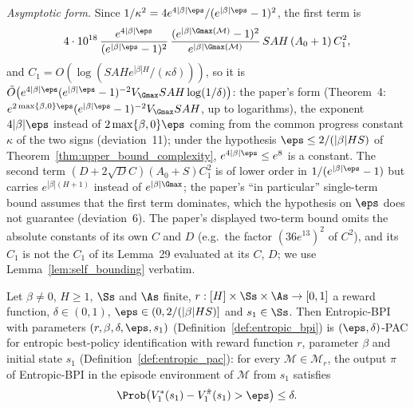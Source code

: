 \begin{remark}
\emph{Asymptotic form.} Since $1/\kappa^2 = 4e^{4|\beta|\eps}/(e^{|\beta|\eps}-1)^2$, the first
term is
\[
  4\cdot 10^{18}\,\frac{e^{4|\beta|\eps}}{(e^{|\beta|\eps} - 1)^2}\,
  \frac{(e^{|\beta|\Gmax(\mathcal M)} - 1)^2}{e^{|\beta|\Gmax(\mathcal M)}}\, SAH\,(A_0 + 1)\,C_1^2 ,
\]
and $C_1 = O(\log(SAH e^{|\beta| H}/(\kappa\delta)))$, so it is
$\tilde O\big(e^{4|\beta|\eps}(e^{|\beta|\eps}-1)^{-2} V_{\Gmax} SAH\log(1/\delta)\big)$: the
paper's form (Theorem~4: $e^{2\max\{\beta,0\}\eps}(e^{|\beta|\eps}-1)^{-2}V_{\Gmax}SAH$, up to
logarithms), the exponent $4|\beta|\eps$ instead of $2\max\{\beta,0\}\eps$ coming from the
common progress constant $\kappa$ of the two signs (deviation~11); under the hypothesis
$\eps \le 2/(|\beta|HS)$ of Theorem~\ref{thm:upper_bound_complexity}, $e^{4|\beta|\eps} \le e^8$
is a constant. The second term $(D + 2\sqrt D C)(A_0+S)C_1^2$ is of lower order in
$1/(e^{|\beta|\eps}-1)$ but carries $e^{|\beta|(H+1)}$ instead of $e^{|\beta|\Gmax}$; the
paper's ``in particular'' single-term bound assumes that the first term dominates, which the
hypothesis on $\eps$ does not guarantee (deviation~6). The paper's displayed two-term bound
omits the absolute constants of its own $C$ and $D$ (e.g.\ the factor $(36e^{13})^2$ of $C^2$),
and its $C_1$ is not the $C_1$ of its Lemma~29 evaluated at its $C$, $D$; we use
Lemma~\ref{lem:self_bounding} verbatim.
\end{remark}

\begin{theorem}\label{thm:upper_bound_pac}
\leanok
{}
Let $\beta \ne 0$, $H \ge 1$, $\Ss$ and $\As$ finite, $r : [H]\times\Ss\times\As \to [0,1]$ a
reward function, $\delta \in (0,1)$, $\eps \in (0, 2/(|\beta| H S)]$ and $s_1 \in \Ss$. Then
Entropic-BPI with parameters $(r, \beta, \delta, \eps, s_1)$ (Definition~\ref{def:entropic_bpi})
is $(\eps,\delta)$-PAC for entropic best-policy identification with reward function $r$,
parameter $\beta$ and initial state $s_1$ (Definition~\ref{def:entropic_pac}): for every
$\mathcal M \in \mathcal M_r$, the output $\hat\pi$ of Entropic-BPI in the episode environment
of $\mathcal M$ from $s_1$ satisfies
\[
  \Prob\big(V^*_1(s_1) - V^{\hat\pi}_1(s_1) > \eps\big) \le \delta .
\]
\end{theorem}

